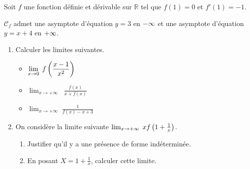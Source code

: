 \begin{exercice}

 Soit $ f $ une  fonction  définie et dérivable sur\;  $\mathbb{R} $ \;  tel que $ f(1)=0 $ \;  et  \; $ f'(1)=-1 $.
 

 
  $ \mathcal{C}_{f} $ admet  une asymptote d'équation $ y=3 $  en $ -\infty $  et une asymptote d'équation $ y=x+4 $  en $ +\infty $.

\begin{enumerate}
\item Calculer les limites suivantes.

\begin{itemize}
\item $\displaystyle \lim_{x \to 0}\; f\left(\frac{x-1}{x^2}\right)$
\item $ \displaystyle\lim_{x \to +\infty}\;\;\frac{f(x)}{ x+f(x)}$
\item $\displaystyle \lim_{x \to +\infty}\; \frac{1}{f(x)-x+3}$
\end{itemize}


\item On considère  la limite  suivante  $ \lim_{x \to +\infty}\; xf\left(1+\frac{1}{x}\right)$.
\begin{enumerate}
\item Justifier qu'il y a une présence de forme indéterminée.
\item En posant $ X=1+\frac{1}{x} $,   calculer cette limite.
\end{enumerate}
\end{enumerate}


\end{exercice}

